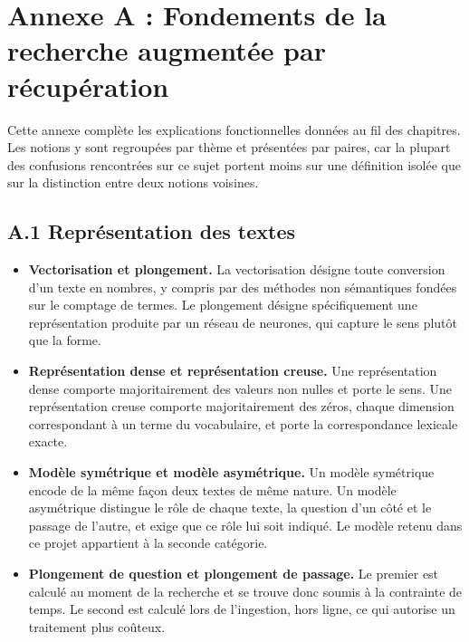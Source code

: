 
\chapter*{Annexe A : Fondements de la recherche augmentée par récupération}

Cette annexe complète les explications fonctionnelles données au fil des chapitres. Les notions y sont regroupées par thème et présentées par paires, car la plupart des confusions rencontrées sur ce sujet portent moins sur une définition isolée que sur la distinction entre deux notions voisines.

\section*{A.1 Représentation des textes}

\begin{itemize}
  \item \textbf{Vectorisation et plongement.} La vectorisation désigne toute conversion d'un texte en nombres, y compris par des méthodes non sémantiques fondées sur le comptage de termes. Le plongement désigne spécifiquement une représentation produite par un réseau de neurones, qui capture le sens plutôt que la forme.
  \item \textbf{Représentation dense et représentation creuse.} Une représentation dense comporte majoritairement des valeurs non nulles et porte le sens. Une représentation creuse comporte majoritairement des zéros, chaque dimension correspondant à un terme du vocabulaire, et porte la correspondance lexicale exacte.
  \item \textbf{Modèle symétrique et modèle asymétrique.} Un modèle symétrique encode de la même façon deux textes de même nature. Un modèle asymétrique distingue le rôle de chaque texte, la question d'un côté et le passage de l'autre, et exige que ce rôle lui soit indiqué. Le modèle retenu dans ce projet appartient à la seconde catégorie.
  \item \textbf{Plongement de question et plongement de passage.} Le premier est calculé au moment de la recherche et se trouve donc soumis à la contrainte de temps. Le second est calculé lors de l'ingestion, hors ligne, ce qui autorise un traitement plus coûteux.
\end{itemize}

